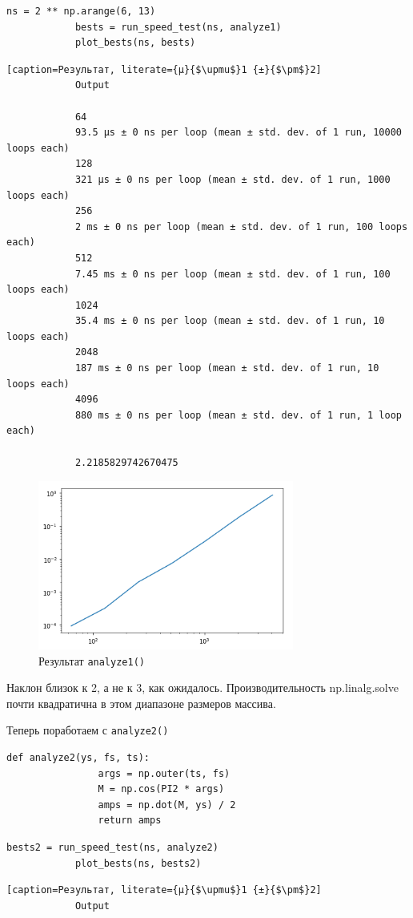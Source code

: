 \documentclass[a4paper,12pt]{article}
\begin{document}
\begin{enumerate}
		\begin{lstlisting}[caption=Работа с \texttt{analyze1}]
			ns = 2 ** np.arange(6, 13)
			bests = run_speed_test(ns, analyze1)
			plot_bests(ns, bests)
		\end{lstlisting}
		
		\begin{lstlisting}[caption=Результат, literate={µ}{$\upmu$}1 {±}{$\pm$}2]
			Output
			
			64
			93.5 µs ± 0 ns per loop (mean ± std. dev. of 1 run, 10000 loops each)
			128
			321 µs ± 0 ns per loop (mean ± std. dev. of 1 run, 1000 loops each)
			256
			2 ms ± 0 ns per loop (mean ± std. dev. of 1 run, 100 loops each)
			512
			7.45 ms ± 0 ns per loop (mean ± std. dev. of 1 run, 100 loops each)
			1024
			35.4 ms ± 0 ns per loop (mean ± std. dev. of 1 run, 10 loops each)
			2048
			187 ms ± 0 ns per loop (mean ± std. dev. of 1 run, 10 loops each)
			4096
			880 ms ± 0 ns per loop (mean ± std. dev. of 1 run, 1 loop each)
			
			2.2185829742670475
		\end{lstlisting}
		
		\begin{figure}[H]
			\centering
			\includegraphics[width=0.75\textwidth]{1_1.png}
			\caption{Результат \texttt{analyze1()}}
			\label{fig:1.1}
		\end{figure}
		
		Наклон близок к 2, а не к 3, как ожидалось. Производительность np.linalg.solve почти квадратична в этом диапазоне размеров массива.
		
		
		Теперь поработаем с \texttt{analyze2()}
		\begin{lstlisting}[caption=Функция \texttt{analyze2()}]
			def analyze2(ys, fs, ts):
				args = np.outer(ts, fs)
				M = np.cos(PI2 * args)
				amps = np.dot(M, ys) / 2
				return amps
		\end{lstlisting}
		\begin{lstlisting}[caption=Работа с \texttt{analyze2()}]
			bests2 = run_speed_test(ns, analyze2)
			plot_bests(ns, bests2)
		\end{lstlisting}
		\begin{lstlisting}[caption=Результат, literate={µ}{$\upmu$}1 {±}{$\pm$}2]
			Output
			

\end{lstlisting}
\end{enumerate}
\end{document}
